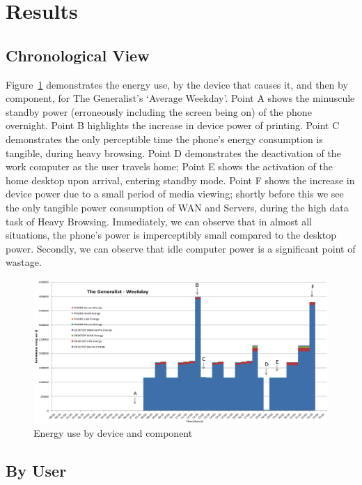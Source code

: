 \documentclass[conference]{IEEEtran}
\begin{document}
\section{Results}

\subsection{Chronological View}

Figure~\ref{fig:generalist_weekday} demonstrates the energy use, by
the device that causes it, and then by component, for The Generalist's
`Average Weekday'. Point A shows the minuscule standby power
(erroneously including the screen being on) of the phone
overnight. Point B highlights the increase in device power of
printing. Point C demonstrates the only perceptible time the phone's
energy consumption is tangible, during heavy browsing. Point D
demonstrates the deactivation of the work computer as the user travels
home; Point E shows the activation of the home desktop upon arrival,
entering standby mode. Point F shows the increase in device power due
to a small period of media viewing; shortly before this we see the
only tangible power consumption of WAN and Servers, during the high
data task of Heavy Browsing. Immediately, we can observe that in
almost all situations, the phone's power is imperceptibly small
compared to the desktop power. Secondly, we can observe that idle
computer power is a significant point of wastage.

\begin{figure}[!htp]
\centering
\includegraphics[width=0.9\columnwidth]{images/generalist_weekday.png}
\caption{Energy use by device and component}
\label{fig:generalist_weekday} 
\end{figure}

\subsection{By User}
\end{document}

